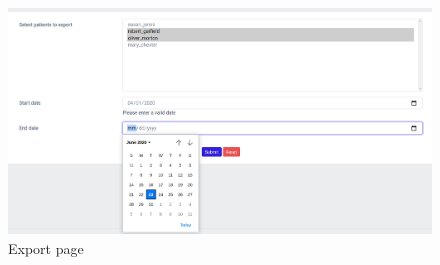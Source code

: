 \documentclass[12pt,english]{article}
\begin{document}
\begin{figure}[H]
  \centering
    \includegraphics[width=\textwidth]{export.png}
  \caption{Export page}
\end{figure}
\end{document}
